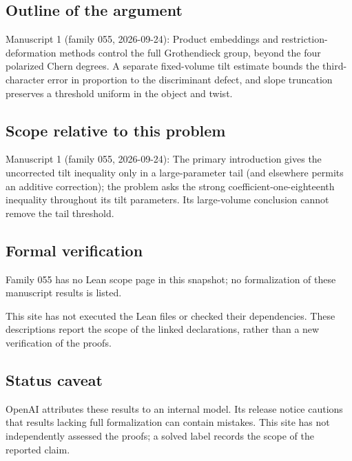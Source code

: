 \documentclass[11pt]{article}
\begin{document}
\subsection{Outline of the argument}
Manuscript 1 (family 055, 2026-09-24): Product embeddings and restriction-deformation methods control the full Grothendieck group, beyond the four polarized Chern degrees. A separate fixed-volume tilt estimate bounds the third-character error in proportion to the discriminant defect, and slope truncation preserves a threshold uniform in the object and twist.

\subsection{Scope relative to this problem}
Manuscript 1 (family 055, 2026-09-24): The primary introduction gives the uncorrected tilt inequality only in a large-parameter tail (and elsewhere permits an additive correction); the problem asks the strong coefficient-one-eighteenth inequality throughout its tilt parameters. Its large-volume conclusion cannot remove the tail threshold.

\subsection{Formal verification}
Family 055 has no Lean scope page in this snapshot; no formalization of these manuscript results is listed.

This site has not executed the Lean files or checked their dependencies. These descriptions report the scope of the linked declarations, rather than a new verification of the proofs.

\subsection{Status caveat}
OpenAI attributes these results to an internal model. Its release notice cautions that results lacking full formalization can contain mistakes. This site has not independently assessed the proofs; a solved label records the scope of the reported claim.
\end{document}
